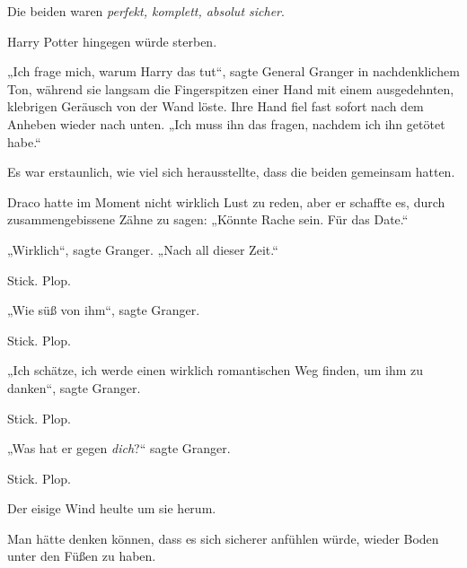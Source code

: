 Die beiden waren \emph{perfekt, komplett, absolut sicher}.

Harry Potter hingegen würde sterben.

„Ich frage mich, warum Harry das tut“, sagte General Granger in nachdenklichem Ton, während sie langsam die Fingerspitzen einer Hand mit einem ausgedehnten, klebrigen Geräusch von der Wand löste. Ihre Hand fiel fast sofort nach dem Anheben wieder nach unten.
„Ich muss ihn das fragen, nachdem ich ihn getötet habe.“

Es war erstaunlich, wie viel sich herausstellte, dass die beiden gemeinsam hatten.

Draco hatte im Moment nicht wirklich Lust zu reden, aber er schaffte es, durch zusammengebissene Zähne zu sagen:
„Könnte Rache sein. Für das Date.“

„Wirklich“, sagte Granger.
„Nach all dieser Zeit.“

Stick. Plop.

„Wie süß von ihm“, sagte Granger.

Stick. Plop.

„Ich schätze, ich werde einen wirklich romantischen Weg finden, um ihm zu danken“, sagte Granger.

Stick. Plop.

„Was hat er gegen \emph{dich}?“ sagte Granger.

Stick. Plop.

Der eisige Wind heulte um sie herum.

\later

Man hätte denken können, dass es sich sicherer anfühlen würde, wieder Boden unter den Füßen zu haben.


